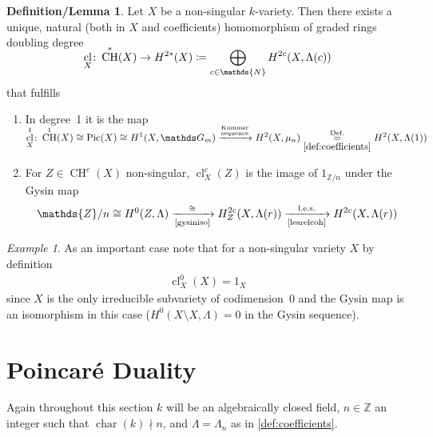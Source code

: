 \documentclass[english]{scrartcl}
\theoremstyle{definition}
\newtheorem{DefLem}[Def]{Definition/Lemma}
\theoremstyle{remark}
\newtheorem{Ex}[Def]{Example}
\newcommand*{\N}{\mathds{N}}
\newcommand*{\Z}{\mathds{Z}}
\newcommand*{\Zmod}[1]{\Z/#1} %
\DeclareMathOperator{\Char}{char} %
\DeclareMathOperator{\CH}{CH} %
\DeclareMathOperator{\Pic}{Pic} %
\DeclareMathOperator{\CL}{cl} %
\newcommand*{\one}[1]{{1_{#1}}}%
\begin{document}
\begin{DefLem}\label{def:cycleclassmap}
  Let $X$ be a non-singular $k$-variety.
  Then there exists a unique, natural (both in $X$ and coefficients)
  homomorphism of graded rings doubling degree
  \begin{gather*}
    \SwapAboveDisplaySkip
    \CL_X\colon \CH^*(X)\rightarrow H^{2*}(X)\coloneqq
    \bigoplus_{c\in\N} H^{2c}(X,\Lambda(c))
  \end{gather*}
  that fulfills
  \begin{enumerate}
  \item In degree~1 it is the map
    \begin{gather*}
      \SwapAboveDisplaySkip
      \CL_X^1\colon
      \CH^1(X)\cong \Pic(X)\cong H^1(X,\mathds G_m)
      \xrightarrow{\footnotesize\substack{\text{Kummer}\\\text{sequence}}}
      H^2(X,\mu_n)
      \overset{\text{Def.}}{\underset{\ref{def:coefficients}}{=}}
      H^2(X,\Lambda(1))
    \end{gather*}
  \item For $Z\in\CH^c(X)$ non-singular, $\CL_X^c(Z)$ is the image of
    $1_{\Zmod{n}}$ under the Gysin map
    \begin{gather*}
      \Zmod{n} \cong H^0(Z,\Lambda)
      \xrightarrow[\text{\ref{gysiniso}}]{\cong}
      H_Z^{2c}(X,\Lambda(r))
      \xrightarrow[\text{\ref{lesrelcoh}}]{\text{l.e.s.}}
      H^{2c}(X,\Lambda(r))
    \end{gather*}
  \end{enumerate}
\end{DefLem}

\begin{Ex}\label{ex:clxx}
  As an important case note that for a non-singular variety $X$
  by definition
  \begin{gather*}
    \CL_{X}^0(X)=\one{X}
  \end{gather*}
  since $X$ is the only irreducible
  subvariety of codimension~$0$ and the Gysin map is an isomorphism in
  this case ($H^0(X\setminus X,\Lambda)=0$ in the Gysin
  sequence).
\end{Ex}

\section{Poincaré Duality}
Again throughout this section $k$ will be an algebraically closed field,
$n\in\Z$ an integer such that $\Char(k)\nmid n$,
and $\Lambda=\Lambda_n$ as in \ref{def:coefficients}.
\end{document}
